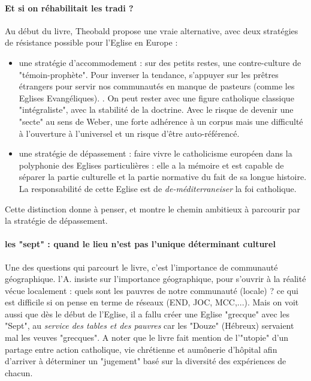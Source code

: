 \paragraph{Et si on réhabilitait les tradi ? } Au début du livre, Theobald propose une vraie alternative, avec deux stratégies de résistance possible pour l'Eglise en Europe :  
\begin{itemize}
    \item une stratégie d'accommodement : sur des petits restes, une contre-culture de "témoin-prophète". Pour inverser la tendance, s'appuyer sur les prêtres étrangers pour servir nos communautés en manque de pasteurs (comme les Eglises Evangéliques). \cite[p. 31]{theobald_urgences_2017}. On peut rester avec une figure catholique classique "intégraliste", avec la stabilité de la doctrine. Avec le risque de devenir une "secte" au sens de Weber, une forte adhérence à un corpus mais une difficulté à l'ouverture à l'universel et un risque d'être auto-référencé.
    \item une stratégie de dépassement : faire vivre le catholicisme européen dans la polyphonie des Eglises particulières : elle a la mémoire et est capable de séparer la partie culturelle et la partie normative du fait de sa longue histoire. La responsabilité de cette Eglise est de \textit{de-méditerraneiser} la foi catholique. 
    
\end{itemize}

Cette distinction donne à penser, et montre le chemin ambitieux à parcourir par la stratégie de dépassement.



\paragraph{les "sept" : quand le lieu n'est pas l'unique déterminant culturel } Une des questions qui parcourt le livre, c'est l'importance de communauté géographique. l'A. insiste sur l'importance géographique, pour s'ouvrir à la réalité vécue localement : quels sont les pauvres de notre communauté (locale) ? ce qui est difficile si on pense en terme de réseaux (END, JOC, MCC,...). Mais on voit aussi que dès le début de l'Eglise, il a fallu créer une Eglise "grecque" avec les "Sept", au \textit{service des tables et des pauvres} car les "Douze" (Hébreux) servaient mal les veuves "grecques".  A noter que le livre fait mention de l'"utopie" d'un partage entre action catholique, vie chrétienne et aumônerie d'hôpital \cite[p3292]{theobald_urgences_2017} afin d'arriver à déterminer un "jugement" basé sur la diversité des expériences de chacun.  


